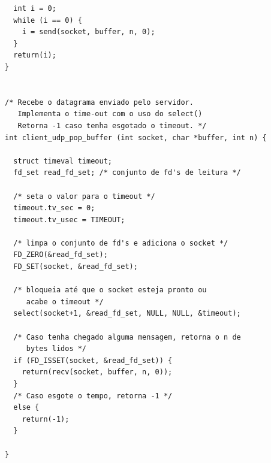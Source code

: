 \documentclass[11pt,twoside]{article}
\begin{document}
\begin{verbatim}
  int i = 0;
  while (i == 0) {
    i = send(socket, buffer, n, 0);
  }
  return(i);
}


/* Recebe o datagrama enviado pelo servidor. 
   Implementa o time-out com o uso do select() 
   Retorna -1 caso tenha esgotado o timeout. */
int client_udp_pop_buffer (int socket, char *buffer, int n) {
  
  struct timeval timeout; 
  fd_set read_fd_set; /* conjunto de fd's de leitura */

  /* seta o valor para o timeout */
  timeout.tv_sec = 0; 
  timeout.tv_usec = TIMEOUT;

  /* limpa o conjunto de fd's e adiciona o socket */
  FD_ZERO(&read_fd_set);
  FD_SET(socket, &read_fd_set); 

  /* bloqueia até que o socket esteja pronto ou
     acabe o timeout */
  select(socket+1, &read_fd_set, NULL, NULL, &timeout);

  /* Caso tenha chegado alguma mensagem, retorna o n de 
     bytes lidos */
  if (FD_ISSET(socket, &read_fd_set)) {
    return(recv(socket, buffer, n, 0));
  }
  /* Caso esgote o tempo, retorna -1 */
  else {
    return(-1);
  }
  
}
\end{verbatim}
\end{document}

